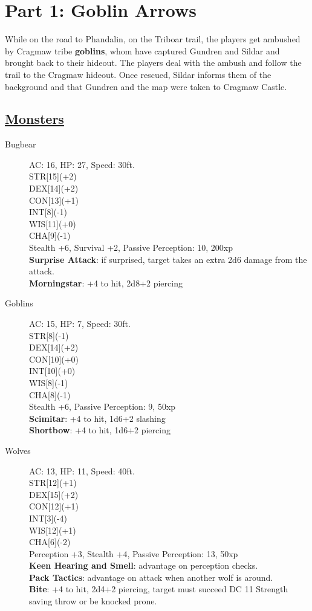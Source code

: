 	\section{Part 1: Goblin Arrows}

While on the road to Phandalin, on the Triboar trail, the players get ambushed by Cragmaw tribe \textbf{goblins}, whom have captured Gundren and Sildar and brought back to their hideout. The players deal with the ambush and follow the trail to the Cragmaw hideout. Once rescued, Sildar informs them of the background and that Gundren and the map were taken to Cragmaw Castle.

\subsection*{\underline{Monsters}}
\begin{description}
	\item[Bugbear] 
	AC: 16, HP: 27, Speed: 30ft.
	\\ STR[15](+2) 
	\\ DEX[14](+2)
	\\ CON[13](+1)
	\\ INT[8](-1)
	\\ WIS[11](+0)
	\\ CHA[9](-1) 
	\\ Stealth +6, Survival +2, Passive Perception: 10, 200xp
	\\ \textbf{Surprise Attack}: if surprised, target takes an extra 2d6 damage from the attack.
	\\ \textbf{Morningstar}: +4 to hit, 2d8+2 piercing
	\item[Goblins] 
	AC: 15, HP: 7, Speed: 30ft.
	\\ STR[8](-1) 
	\\ DEX[14](+2)
	\\ CON[10](+0)
	\\ INT[10](+0)
	\\ WIS[8](-1)
	\\ CHA[8](-1) 
	\\ Stealth +6, Passive Perception: 9, 50xp
	\\ \textbf{Scimitar}: +4 to hit, 1d6+2 slashing
	\\ \textbf{Shortbow}: +4 to hit, 1d6+2 piercing
	\item[Wolves]
	AC: 13, HP: 11, Speed: 40ft.
	\\ STR[12](+1) 
	\\ DEX[15](+2)
	\\ CON[12](+1)
	\\ INT[3](-4)
	\\ WIS[12](+1)
	\\ CHA[6](-2) 
	\\ Perception +3, Stealth +4, Passive Perception: 13, 50xp
	\\ \textbf{Keen Hearing and Smell}: advantage on perception checks.
	\\ \textbf{Pack Tactics}: advantage on attack when another wolf is around.
	\\ \textbf{Bite}: +4 to hit, 2d4+2 piercing, target must succeed DC 11 Strength saving throw or be knocked prone.
\end{description}